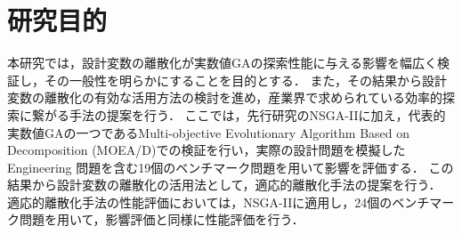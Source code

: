 \documentclass[../main/main]{subfiles}
\begin{document}
%
%

\section{研究目的}
\quad 本研究では，設計変数の離散化が実数値GAの探索性能に与える影響を幅広く検証し，その一般性を明らかにすることを目的とする．
また，その結果から設計変数の離散化の有効な活用方法の検討を進め，産業界で求められている効率的探索に繋がる手法の提案を行う．
ここでは，先行研究のNSGA-IIに加え，代表的実数値GAの一つであるMulti-objective Evolutionary Algorithm Based on Decomposition (MOEA/D)\cite{Zhang2007MOEAD}での検証を行い，実際の設計問題を模擬した Engineering 問題を含む19個のベンチマーク問題を用いて影響を評価する．
この結果から設計変数の離散化の活用法として，適応的離散化手法の提案を行う．
適応的離散化手法の性能評価においては，NSGA-IIに適用し，24個のベンチマーク問題を用いて，影響評価と同様に性能評価を行う．
\end{document}

